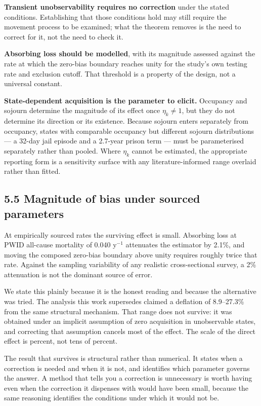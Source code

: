 \textbf{Transient unobservability requires no correction} under the stated conditions. Establishing that those conditions hold may still require the movement process to be examined; what the theorem removes is the need to correct for it, not the need to check it.

\textbf{Absorbing loss should be modelled}, with its magnitude assessed against the rate at which the zero-bias boundary reaches unity for the study's own testing rate and exclusion cutoff. That threshold is a property of the design, not a universal constant.

\textbf{State-dependent acquisition is the parameter to elicit.} Occupancy and sojourn determine the magnitude of its effect once \(\eta_k\ne1\), but they do not determine its direction or its existence. Because sojourn enters separately from occupancy, states with comparable occupancy but different sojourn distributions --- a 32-day jail episode and a 2.7-year prison term --- must be parameterised separately rather than pooled. Where \(\eta_k\) cannot be estimated, the appropriate reporting form is a sensitivity surface with any literature-informed range overlaid rather than fitted.

\subsection{5.5 Magnitude of bias under sourced parameters}

At empirically sourced rates the surviving effect is small. Absorbing loss at PWID all-cause mortality of 0.040 y\(^{-1}\) attenuates the estimator by 2.1\%, and moving the composed zero-bias boundary above unity requires roughly twice that rate. Against the sampling variability of any realistic cross-sectional survey, a 2\% attenuation is not the dominant source of error.

We state this plainly because it is the honest reading and because the alternative was tried. The analysis this work supersedes claimed a deflation of 8.9--27.3\% from the same structural mechanism. That range does not survive: it was obtained under an implicit assumption of zero acquisition in unobservable states, and correcting that assumption cancels most of the effect. The scale of the direct effect is percent, not tens of percent.

The result that survives is structural rather than numerical. It states when a correction is needed and when it is not, and identifies which parameter governs the answer. A method that tells you a correction is unnecessary is worth having even when the correction it dispenses with would have been small, because the same reasoning identifies the conditions under which it would not be.

